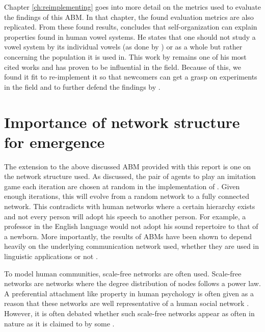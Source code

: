 Chapter \ref{ch:reimplementing} goes into more detail on the metrics used to evaluate the findings of this ABM.
In that chapter, the found evaluation metrics are also replicated.
From these found results, \citet{deBoer2000} concludes that self-organization can explain properties found in human vowel systems.
He states that one should not study a vowel system by its individual vowels (as done by \cite{chomsky}) or as a whole \citep{landl} but rather concerning the population it is used in.
This work by \citet{deBoer2000} remains one of his most cited works and has proven to be influential in the field.
Because of this, we found it fit to re-implement it so that newcomers can get a grasp on experiments in the field and to further defend the findings by \citet{deBoer2000}.








\section{Importance of network structure for emergence}
\label{sec:literature_emergence}

The extension to the above discussed ABM provided with this report is one on the network structure used.
As discussed, the pair of agents to play an imitation game each iteration are chosen at random in the implementation of \citet{deBoer2000}.
Given enough iterations, this will evolve from a random network to a fully connected network.
This contradicts with human networks where a certain hierarchy exists and not every person will adopt his speech to another person.
For example, a professor in the English language would not adopt his sound repertoire to that of a newborn.
More importantly, the results of ABMs have been shown to depend heavily on the underlying communication network used, whether they are used in linguistic applications or not \citep{network1, network2, network3}.

To model human communities, scale-free networks are often used.
Scale-free networks are networks where the degree distribution of nodes follows a power law.
A preferential attachment like property in human psychology is often given as a reason that these networks are well representative of a human social network \citet{scalefreegood}.
However, it is often debated whether such scale-free networks appear as often in nature as it is claimed to by some \citep{scalefreebad}.

